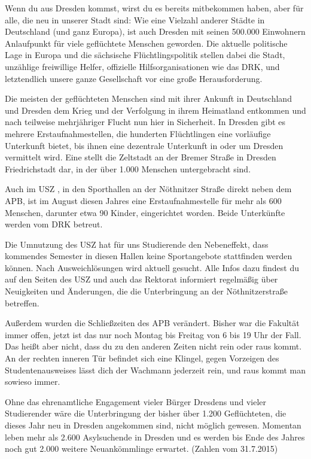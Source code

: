 
Wenn du aus Dresden kommst, wirst du es bereits mitbekommen haben, aber für alle, die neu in unserer Stadt sind: Wie eine Vielzahl anderer Städte in Deutschland (und ganz Europa), ist auch Dresden mit seinen 500.000 Einwohnern Anlaufpunkt für viele geflüchtete Menschen geworden. Die aktuelle politische Lage in Europa und die sächsische Flüchtlingspolitik stellen dabei die Stadt, unzählige freiwillige Helfer, offizielle Hilfsorganisationen wie das DRK, und letztendlich unsere ganze Gesellschaft vor eine große Herausforderung. 

Die meisten der geflüchteten Menschen sind mit ihrer Ankunft in Deutschland und Dresden dem Krieg und der Verfolgung in ihrem Heimatland entkommen und nach teilweise mehrjähriger Flucht nun hier in Sicherheit. In Dresden gibt es mehrere Erstaufnahmestellen, die hunderten Flüchtlingen eine vorläufige Unterkunft bietet, bis ihnen eine dezentrale Unterkunft in oder um Dresden vermittelt wird. Eine stellt die Zeltstadt an der Bremer Straße in Dresden Friedrichstadt dar, in der über 1.000 Menschen untergebracht sind.

Auch im USZ , in den Sporthallen an der Nöthnitzer Straße direkt neben dem APB, ist im August diesen Jahres eine Erstaufnahmestelle für mehr als 600 Menschen, darunter etwa 90 Kinder, eingerichtet worden.   Beide Unterkünfte werden vom DRK betreut.

Die Umnutzung des USZ hat für uns Studierende den Nebeneffekt, dass kommendes Semester in diesen Hallen keine Sportangebote stattfinden werden können. Nach Ausweichlösungen wird aktuell gesucht. Alle Infos dazu findest du auf den Seiten des USZ und auch das Rektorat informiert regelmäßig über Neuigkeiten und Änderungen, die die Unterbringung an der Nöthnitzerstraße betreffen. 

Außerdem wurden die Schließzeiten des APB verändert. Bisher war die Fakultät immer offen, jetzt ist das nur noch Montag bis Freitag von 6 bis 19 Uhr der Fall. Das heißt aber nicht, dass du zu den anderen Zeiten nicht rein oder raus kommt. An der rechten inneren Tür befindet sich eine Klingel, gegen Vorzeigen des Studentenausweises lässt dich der Wachmann jederzeit rein, und raus kommt man sowieso immer.

Ohne das ehrenamtliche Engagement vieler Bürger Dresdens und vieler Studierender wäre die Unterbringung der bisher über 1.200 Geflüchteten, die dieses Jahr neu in Dresden angekommen sind, nicht möglich gewesen. Momentan leben mehr als 2.600 Asylsuchende in Dresden und es werden bis Ende des Jahres noch gut 2.000 weitere Neuankömmlinge erwartet.  (Zahlen vom 31.7.2015) 

